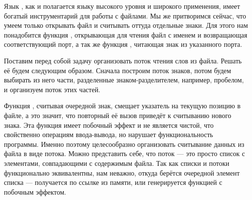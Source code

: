 Язык \Scheme, как и полагается языку высокого уровня и широкого применения, имеет богатый инструментарий для работы с файлами. Мы же притворимся сейчас, что умеем только открывать файл и считывать оттуда отдельные знаки. Для этого нам понадобится функция , открывающая для чтения файл с именем  и возвращающая соответствующий порт, а так же функция , читающая знак из указанного порта. 

Поставим перед собой задачу организовать поток чтения слов из файла. Решать её будем следующим образом. Сначала построим поток знаков, потом будем выбирать из него части, разделенные знаком-разделителем, например, пробелом, и организуем поток этих частей.

Функция , считывая очередной знак, смещает указатель на текущую позицию в файле, а это значит, что повторный её вызов приведёт к считыванию нового знака. Эта функция имеет побочный эффект и не является чистой, что свойственно операциям ввода-вывода, но нарушает функциональность программы. Именно поэтому целесообразно организовать считывание данных из файла в виде потока. Можно представить себе, что поток --- это просто список с элементами, совпадающими с содержимым файла. Так как списки и потоки функционально эквивалентны, нам неважно, откуда берётся очередной элемент списка --- получается по ссылке из памяти, или генерируется функцией с побочным эффектом.

